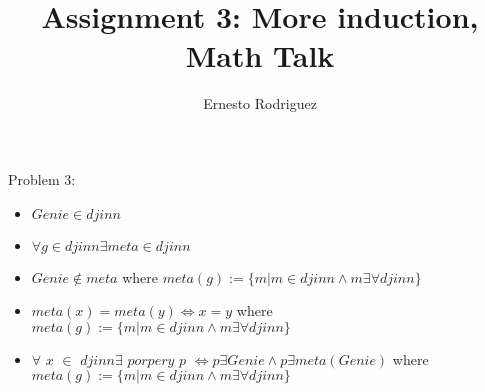 \documentclass{article}
\title{Assignment 3: More induction, Math Talk}
\author{Ernesto Rodriguez}
\begin{document}
\maketitle

Problem 3:

\begin{itemize}

\item{$Genie \in djinn$}
\item{$\forall g \in djinn \exists meta \in djinn$}
\item{$Genie \notin meta$ where $meta(g):=\{m | m \in djinn \wedge m \exists \forall djinn\}$}
\item{$meta(x)=meta(y) \iff x=y$ where $meta(g):=\{m | m \in djinn \wedge m \exists \forall djinn\}$}
\item{$\forall$ $x$ $\in$ $djinn \exists$ $porpery$ $p$ $\iff p \exists Genie \wedge p \exists meta(Genie)$ \newline
where $meta(g):=\{m | m \in djinn \wedge m \exists \forall djinn\}$
}

\end{itemize}
\end{document}
